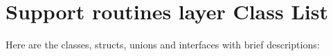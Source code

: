 \section{Support routines layer Class List}
Here are the classes, structs, unions and interfaces with brief descriptions:\begin{CompactList}
\item{}
\end{CompactList}
